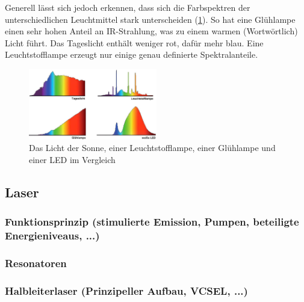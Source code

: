 	Generell lässt sich jedoch erkennen, dass sich die Farbspektren der unterschiedlichen Leuchtmittel stark unterscheiden (\ref{11_spektrum}). So hat eine Glühlampe einen sehr hohen Anteil an IR-Strahlung, was zu einem warmen (Wortwörtlich) Licht führt. Das Tageslicht enthält weniger rot, dafür mehr blau. Eine Leuchtstofflampe erzeugt nur einige genau definierte Spektralanteile. 
	
	\begin{figure}
		\centering
		\includegraphics[width=0.5\textwidth]{Kapitel/Kap11/spektrum.png}
		\caption{Das Licht der Sonne, einer Leuchtstofflampe, einer Glühlampe und einer LED im Vergleich}
		\label{11_spektrum}
	\end{figure}
	
\subsection{Laser}
	\subsubsection{Funktionsprinzip (stimulierte Emission, Pumpen, beteiligte Energieniveaus, ...)}
	
	\subsubsection{Resonatoren}
	\subsubsection{Halbleiterlaser (Prinzipeller Aufbau, VCSEL, ...)}


